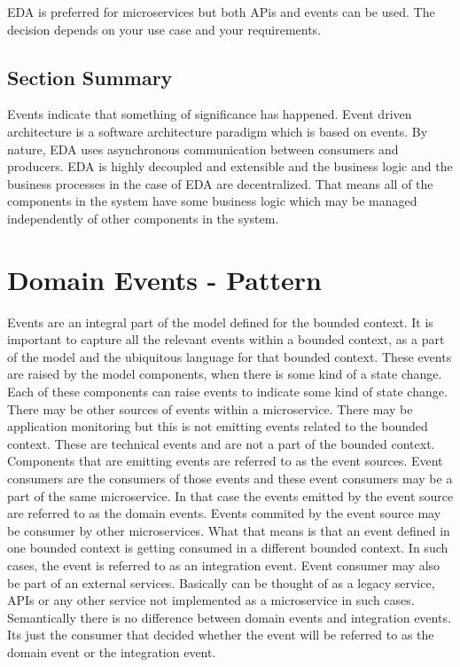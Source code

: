 \documentclass[a4paper, 11pt]{book}
\begin{document}
    EDA is preferred for microservices but both APis and events can be used.
    The decision depends on your use case and your requirements.

    \subsection{Section Summary}
    Events indicate that something of significance has happened.
    Event driven architecture is a software architecture paradigm which is based on events.
    By nature, EDA uses asynchronous communication between consumers and producers.
    EDA is highly decoupled and extensible and the business logic and the business processes in the case of EDA are decentralized.
    That means all of the components in the system have some business logic which may be managed independently of other components in the system.


    \section{Domain Events - Pattern}
    Events are an integral part of the model defined for the bounded context.
    It is important to capture all the relevant events within a bounded context, as a part of the model and the ubiquitous language for that bounded context.
    These events are raised by the model components, when there is some kind of a state change.
    Each of these components can raise events to indicate some kind of state change.
    There may be other sources of events within a microservice.
    There may be application monitoring but this is not emitting events related to the bounded context.
    These are technical events and are not a part of the bounded context.
    Components that are emitting events are referred to as the event sources.
    Event consumers are the consumers of those events and these event consumers may be a part of the same microservice.
    In that case the events emitted by the event source are referred to as the domain events.
    Events commited by the event source may be consumer by other microservices.
    What that means is that an event defined in one bounded context is getting consumed in a different bounded context.
    In such cases, the event is referred to as an integration event.
    Event consumer may also be part of an external services. Basically can be thought of as a legacy service, APIs or any other service not implemented as a microservice in such cases.
    Semantically there is no difference between domain events and integration events.
    Its just the consumer that decided whether the event will be referred to as the domain event or the integration event.
\end{document}
